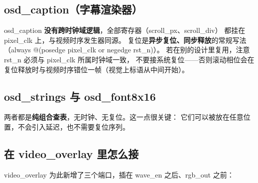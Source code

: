 \documentclass[10pt,a4paper]{article}
\newcommand{\sig}[1]{{\ttfamily\small #1}}
\newcommand{\reg}[1]{{\ttfamily #1}}
\newcommand{\code}[1]{{\ttfamily\small #1}}
\begin{document}
\subsection{\sig{osd\_caption}（字幕渲染器）}

\begin{table}[htbp]
\centering\small
\caption{\sig{osd\_caption} 端口表。方向以模块为参照：$\rightarrow$ 输入，$\leftarrow$ 输出。}
\label{tab:ports-caption}
\renewcommand{\arraystretch}{1.22}

\end{table}

\begin{dswarn}[时钟域与复位约定]
\sig{osd\_caption} \textbf{没有跨时钟域逻辑}，全部寄存器（\reg{scroll\_px}、\reg{scroll\_div}）
都挂在 \sig{pixel\_clk} 上，与视频时序发生器同源。
复位是\textbf{异步复位、同步释放}的常规写法（\code{always @(posedge pixel\_clk or negedge rst\_n)}）。
若在别的设计里复用，注意 \sig{rst\_n} 必须与 \sig{pixel\_clk} 所属时钟域一致，
不要接系统复位——否则滚动相位会在复位释放时与视频时序错位一帧（视觉上标语从中间开始）。
\end{dswarn}

\subsection{\sig{osd\_strings} 与 \sig{osd\_font8x16}}

两者都是\textbf{纯组合查表}，无时钟、无复位。这一点很关键：
它们可以被放在任意位置，不会引入延迟，也不需要复位序列。

\begin{table}[htbp]
\centering\small
\caption{两级查表的端口。注意 \sig{osd\_font8x16} 的索引是 \code{char\_code[5:0]} 而非
\code{char\_code - 0x20}，理由见 \ref{sec:font}~节。}
\label{tab:ports-lut}
\renewcommand{\arraystretch}{1.22}
\begin{minipage}[t]{0.48\linewidth}

\end{minipage}\hfill
\begin{minipage}[t]{0.48\linewidth}

\end{minipage}
\end{table}

\subsection{在 \sig{video\_overlay} 里怎么接}

\sig{video\_overlay} 为此新增了三个端口，插在 \sig{wave\_en} 之后、\sig{rgb\_out} 之前：
\end{document}
